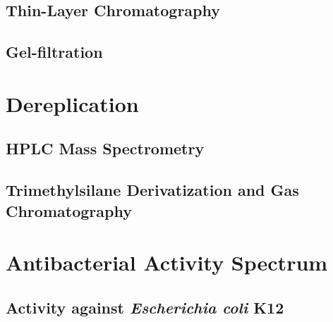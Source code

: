 
    \subsection{Thin-Layer Chromatography} %
    \label{sub:results_thin_layer_chromatography}

    
    \subsection{Gel-filtration} %
    \label{sub:results_gel_filtration}


\section{Dereplication} %
\label{sec:dereplication}

    \subsection{HPLC Mass Spectrometry} %
    \label{sub:hplc_mass_spectrometry}


    \subsection{Trimethylsilane Derivatization and Gas Chromatography} %
    \label{sub:trimethylsilane_derivatization_and_gas_chromatography_results}

    


\section{Antibacterial Activity Spectrum} %
\label{sec:antibacterial_activity_spectrum}


    \subsection{Activity against \textit{Escherichia coli} K12} %
    \label{sub:activity_against_e_coli}

